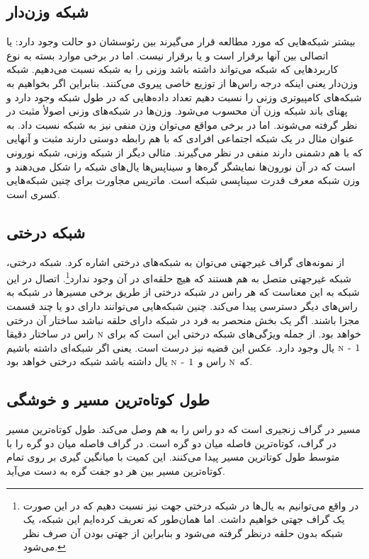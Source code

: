 \subsection{شبکه وزن‌دار}
بیشتر شبکه‌هایی که مورد مطالعه قرار می‌گیرند بین رئوسشان دو حالت وجود دارد: یا اتصالی  بین آنها برقرار است  و یا برقرار نیست. اما در برخی موارد  بسته به نوع کاربرد‌هایی که شبکه می‌تواند داشته باشد وزنی را به شبکه نسبت می‌دهیم. شبکه وزن‌دار یعنی اینکه درجه راس‌ها از توزیع خاصی پیروی می‌کنند. بنابراین اگر بخواهیم به شبکه‌های کامپیوتری وزنی را نسبت دهیم تعداد داده‌هایی که در طول شبکه وجود دارد و پهنای باند شبکه وزن آن محسوب می‌شود. وزن‌ها در شبکه‌های وزنی اصولأ مثبت در نظر گرفته می‌شوند. اما در برخی مواقع می‌توان وزن منفی نیز به شبکه نسبت داد. به عنوان مثال در یک شبکه اجتماعی افرادی که با هم رابطه دوستی دارند مثبت و آنهایی که با هم دشمنی دارند منفی در نظر می‌گیرند. مثالی دیگر از شبکه وزنی، شبکه نورونی است که در آن نورون‌ها نمایشگر گره‌ها و سیناپس‌ها یال‌های شبکه را شکل می‌دهند و وزن شبکه معرف قدرت سیناپسی  شبکه است. ماتریس مجاورت برای  چنین شبکه‌هایی کسری است. 
 
 \subsection{شبکه درختی}
  از نمونه‌های گراف غیرجهتی می‌توان به شبکه‌های درختی اشاره کرد. شبکه درختی، شبکه غیرجهتی متصل به هم هستند که هیچ حلقه‌ای در آن وجود ندارد\normalfootnotes\footnote{در واقع می‌توانیم به یال‌ها در شبکه درختی جهت نیز نسبت دهیم که در این صورت یک گراف جهتی خواهیم داشت. اما همان‌طور که تعریف کرده‌ایم این شبکه، یک شبکه بدون حلقه درنظر گرفته می‌شود و بنابراین از جهتی بودن آن صرف نظر می‌شود.}. اتصال در این شبکه به این معناست که هر راس در شبکه درختی از طریق برخی مسیر‌ها در شبکه به راس‌های دیگر دسترسی پیدا می‌کند. چنین شبکه‌هایی می‌توانند دارای دو یا چند قسمت مجزا باشند. اگر یک بخش منحصر به فرد در شبکه دارای حلقه نباشد ساختار آن درختی خواهد بود. از  جمله ویژگی‌های شبکه درختی این است که برای   $\textsc{n}$ راس در ساختار دقیقا   $\textsc{n - 1}$ یال وجود دارد. عکس این قضیه نیز درست است. یعنی اگر شبکه‌‌ای داشته باشیم که   $\textsc{n}$ راس و $\textsc{n - 1}$ یال داشته باشد شبکه درختی خواهد بود.

\subsection{طول کوتاه‌ترین مسیر و خوشگی}
مسیر در گراف زنجیری است که دو راس را به هم وصل می‌کند. طول کوتاه‌ترین مسیر  در گراف، کوتاه‌ترین فاصله میان دو گره است. در گراف فاصله میان دو گره را با متوسط طول کوتا‌ترین مسیر  پیدا می‌کنند. این کمیت با میانگین گیری بر روی تمام کوتاه‌ترین مسیر بین هر دو جفت گره به دست می‌آید.

